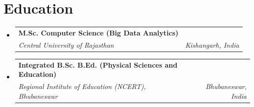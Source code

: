 \documentclass[letterpaper,11pt]{article}
\makeatletter
\newcommand{\resumeSubheading}[4]{
  \vspace{-2pt}\item
    \begin{tabular*}{0.97\textwidth}[t]{l@{\extracolsep{\fill}}r}
      \textbf{#1} & #2 \\
      \textit{\small#3} & \textit{\small #4} \\
    \end{tabular*}\vspace{-8pt}
}
\newcommand{\resumeSubHeadingListStart}{\begin{itemize}[leftmargin=0.15in, label={}]}
\newcommand{\resumeSubHeadingListEnd}{\end{itemize}}
\makeatother
\begin{document}
\section{Education}
  \resumeSubHeadingListStart
    \resumeSubheading
      {M.Sc. Computer Science (Big Data Analytics)}{}
      {Central University of Rajasthan}{Kishangarh, India}
    \resumeSubheading
      {Integrated B.Sc. B.Ed. (Physical Sciences and Education)}{}
      {Regional Institute of Education (NCERT), Bhubaneswar}{Bhubaneswar, India}
  \resumeSubHeadingListEnd\vspace{-2pt}
\end{document}
